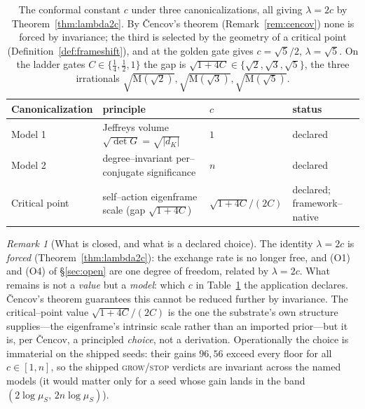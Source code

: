 \documentclass[11pt]{article}
\theoremstyle{plain}
\theoremstyle{definition}
\theoremstyle{remark}
\newtheorem{remark}[theorem]{Remark}
\newcommand{\K}{K}
\newcommand{\Mah}{\mathrm{M}}
\newcommand{\GG}{G}
\begin{document}
\begin{table}[t]\centering
\small
\begin{tabular}{llll}
\toprule
Canonicalization & principle & $c$ & status \\
\midrule
Model 1 & Jeffreys volume $\sqrt{\det\GG}=\sqrt{|d_\K|}$ & $1$ & declared \cite{Jeffreys} \\
Model 2 & degree--invariant per--conjugate significance & $n$ & declared \\
Critical point & self--action eigenframe scale (gap $\sqrt{1+4C}$) & $\sqrt{1+4C}/(2C)$ & declared; framework--native \\
\bottomrule
\end{tabular}
\caption{The conformal constant $c$ under three canonicalizations, all giving $\lambda=2c$ by
Theorem~\ref{thm:lambda2c}. By \v{C}encov's theorem (Remark~\ref{rem:cencov}) none is forced by invariance; the
third is selected by the geometry of a critical point (Definition~\ref{def:frameshift}), and at the golden gate
gives $c=\sqrt5/2$, $\lambda=\sqrt5$. On the ladder gates $C\in\{\tfrac14,\tfrac12,1\}$ the gap is
$\sqrt{1+4C}\in\{\sqrt2,\sqrt3,\sqrt5\}$, the three irrationals $\sqrt{\Mah(\sqrt2)},\sqrt{\Mah(\sqrt3)},
\sqrt{\Mah(\sqrt5)}$.}
\label{tab:canon}
\end{table}

\begin{remark}[What is closed, and what is a declared choice]\label{rem:lambdaclose}
The identity $\lambda=2c$ is \emph{forced} (Theorem~\ref{thm:lambda2c}): the exchange rate is no longer free, and
(O1) and (O4) of \S\ref{sec:open} are one degree of freedom, related by $\lambda=2c$. What remains is not a
\emph{value} but a \emph{model}: which $c$ in Table~\ref{tab:canon} the application declares. \v{C}encov's theorem
guarantees this cannot be reduced further by invariance. The critical--point value $\sqrt{1+4C}/(2C)$ is the one
the substrate's own structure supplies---the eigenframe's intrinsic scale rather than an imported prior---but it
is, per \v{C}encov, a principled \emph{choice}, not a derivation. Operationally the choice is immaterial on the
shipped seeds: their gains $96,56$ exceed every floor for all $c\in[1,n]$, so the shipped \textsc{grow}/\textsc{stop}
verdicts are invariant across the named models (it would matter only for a seed whose gain lands in the band
$(2\log\mu_S,\,2n\log\mu_S)$).
\end{remark}
\end{document}
